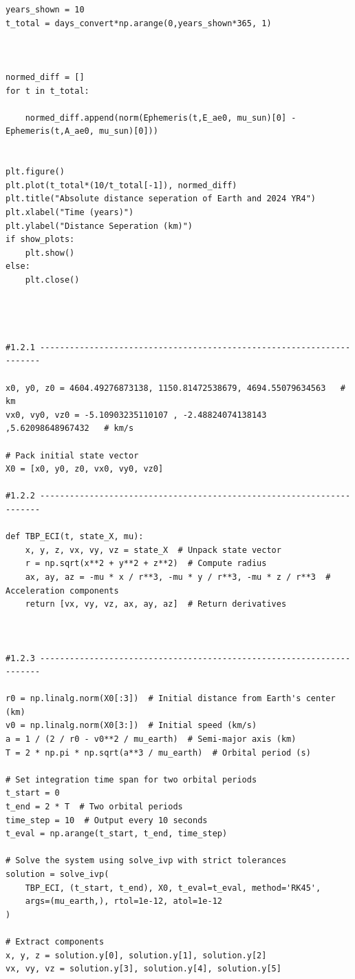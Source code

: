 \documentclass[a4paper, 12pt]{article}  %
\begin{document}
\begin{lstlisting}
years_shown = 10
t_total = days_convert*np.arange(0,years_shown*365, 1)



normed_diff = []
for t in t_total:
    
    normed_diff.append(norm(Ephemeris(t,E_ae0, mu_sun)[0] - Ephemeris(t,A_ae0, mu_sun)[0]))
    
    
plt.figure()
plt.plot(t_total*(10/t_total[-1]), normed_diff)
plt.title("Absolute distance seperation of Earth and 2024 YR4")
plt.xlabel("Time (years)")
plt.ylabel("Distance Seperation (km)")
if show_plots:
    plt.show()
else:
    plt.close()
    



#1.2.1 ----------------------------------------------------------------------

x0, y0, z0 = 4604.49276873138, 1150.81472538679, 4694.55079634563   # km
vx0, vy0, vz0 = -5.10903235110107 , -2.48824074138143 ,5.62098648967432   # km/s

# Pack initial state vector
X0 = [x0, y0, z0, vx0, vy0, vz0]

#1.2.2 ----------------------------------------------------------------------

def TBP_ECI(t, state_X, mu):
    x, y, z, vx, vy, vz = state_X  # Unpack state vector
    r = np.sqrt(x**2 + y**2 + z**2)  # Compute radius
    ax, ay, az = -mu * x / r**3, -mu * y / r**3, -mu * z / r**3  # Acceleration components
    return [vx, vy, vz, ax, ay, az]  # Return derivatives



#1.2.3 ----------------------------------------------------------------------

r0 = np.linalg.norm(X0[:3])  # Initial distance from Earth's center (km)
v0 = np.linalg.norm(X0[3:])  # Initial speed (km/s)
a = 1 / (2 / r0 - v0**2 / mu_earth)  # Semi-major axis (km)
T = 2 * np.pi * np.sqrt(a**3 / mu_earth)  # Orbital period (s)

# Set integration time span for two orbital periods
t_start = 0
t_end = 2 * T  # Two orbital periods
time_step = 10  # Output every 10 seconds
t_eval = np.arange(t_start, t_end, time_step)  

# Solve the system using solve_ivp with strict tolerances
solution = solve_ivp(
    TBP_ECI, (t_start, t_end), X0, t_eval=t_eval, method='RK45',
    args=(mu_earth,), rtol=1e-12, atol=1e-12
)

# Extract components
x, y, z = solution.y[0], solution.y[1], solution.y[2]
vx, vy, vz = solution.y[3], solution.y[4], solution.y[5]


\end{lstlisting}
\end{document}
